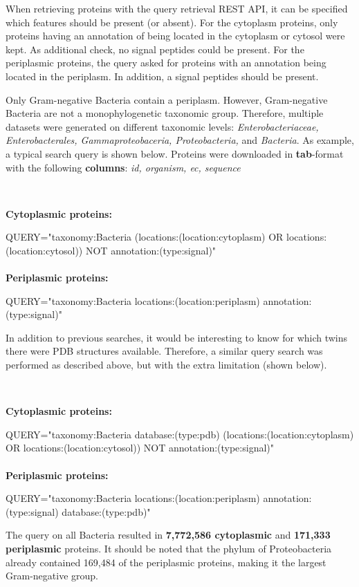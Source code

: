 When retrieving proteins with the query retrieval REST API, 
it can be specified which features should be present (or absent).
For the cytoplasm proteins, only proteins having an annotation of being located in the cytoplasm or cytosol were kept.
As additional check, no signal peptides could be present.
For the periplasmic proteins, the query asked for proteins with an annotation being located in the periplasm.
In addition, a signal peptides should be present.

Only Gram-negative Bacteria contain a periplasm. 
However, Gram-negative Bacteria are not a monophylogenetic taxonomic group.
Therefore, multiple datasets were generated on different taxonomic levels:
\textit{
Enterobacteriaceae,
Enterobacterales,
Gammaproteobaceria,
Proteobacteria,
}
and \textit{Bacteria}.
As example, a typical search query is shown below.
Proteins were downloaded in \textbf{tab}-format with the following \textbf{columns}:
\textit{
	id,
	organism,
	ec,
	sequence
}

~\begin{tcolorbox}
	\textbf{Cytoplasmic proteins:}

	QUERY="taxonomy:Bacteria (locations:(location:cytoplasm) OR locations:(location:cytosol)) NOT annotation:(type:signal)"
	\\
	\\
	\textbf{Periplasmic proteins:}

	QUERY="taxonomy:Bacteria locations:(location:periplasm) annotation:(type:signal)"
~\end{tcolorbox}

In addition to previous searches, 
it would be interesting to know for which twins there were PDB structures available.
Therefore, a similar query search was performed as described above, but with the extra limitation
(shown below).

~\begin{tcolorbox}
	\textbf{Cytoplasmic proteins:}

	QUERY="taxonomy:Bacteria database:(type:pdb) (locations:(location:cytoplasm) OR locations:(location:cytosol)) NOT annotation:(type:signal)"
	\\
	\\
	\textbf{Periplasmic proteins:}

	QUERY="taxonomy:Bacteria locations:(location:periplasm) annotation:(type:signal) database:(type:pdb)"
~\end{tcolorbox}

 The query on all Bacteria resulted in \textbf{7,772,586 cytoplasmic} and 
 \textbf{171,333 periplasmic} proteins. 
 It should be noted that the phylum of Proteobacteria already contained 169,484 of the periplasmic proteins,
making it the largest Gram-negative group.
